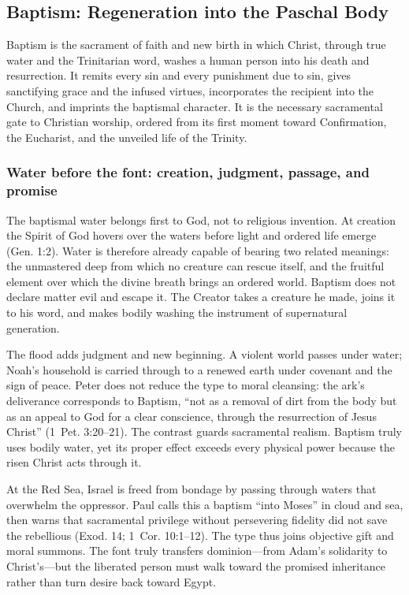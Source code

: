 \subsection{Baptism: Regeneration into the Paschal Body}

Baptism is the sacrament of faith and new birth in which Christ, through true water and the Trinitarian word, washes a human person into his death and resurrection. It remits every sin and every punishment due to sin, gives sanctifying grace and the infused virtues, incorporates the recipient into the Church, and imprints the baptismal character. It is the necessary sacramental gate to Christian worship, ordered from its first moment toward Confirmation, the Eucharist, and the unveiled life of the Trinity.

\subsubsection{Water before the font: creation, judgment, passage, and promise}

The baptismal water belongs first to God, not to religious invention. At creation the Spirit of God hovers over the waters before light and ordered life emerge (Gen. 1:2). Water is therefore already capable of bearing two related meanings: the unmastered deep from which no creature can rescue itself, and the fruitful element over which the divine breath brings an ordered world. Baptism does not declare matter evil and escape it. The Creator takes a creature he made, joins it to his word, and makes bodily washing the instrument of supernatural generation.

The flood adds judgment and new beginning. A violent world passes under water; Noah's household is carried through to a renewed earth under covenant and the sign of peace. Peter does not reduce the type to moral cleansing: the ark's deliverance corresponds to Baptism, ``not as a removal of dirt from the body but as an appeal to God for a clear conscience, through the resurrection of Jesus Christ'' (1~Pet. 3:20--21). The contrast guards sacramental realism. Baptism truly uses bodily water, yet its proper effect exceeds every physical power because the risen Christ acts through it.

At the Red Sea, Israel is freed from bondage by passing through waters that overwhelm the oppressor. Paul calls this a baptism ``into Moses'' in cloud and sea, then warns that sacramental privilege without persevering fidelity did not save the rebellious (Exod. 14; 1~Cor. 10:1--12). The type thus joins objective gift and moral summons. The font truly transfers dominion---from Adam's solidarity to Christ's---but the liberated person must walk toward the promised inheritance rather than turn desire back toward Egypt.

